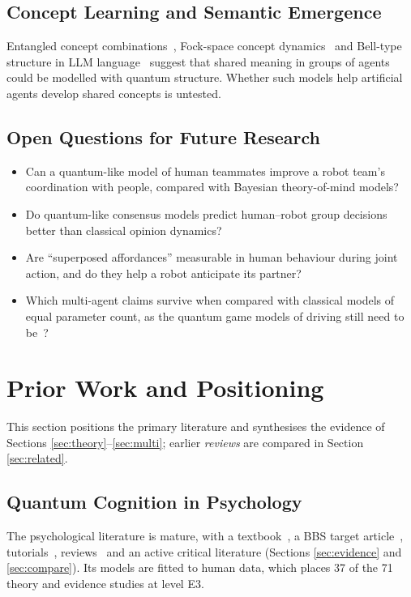 \documentclass[pdflatex,sn-basic]{sn-jnl}
\begin{document}
\subsection{Concept Learning and Semantic Emergence}\label{sec:concepts}
Entangled concept combinations~\citep{Aerts2011a}, Fock-space concept dynamics~\citep{Aerts2013} and Bell-type structure in LLM language~\citep{Aerts2026} suggest that shared meaning in groups of agents could be modelled with quantum structure. Whether such models help artificial agents develop shared concepts is untested.

\subsection{Open Questions for Future Research}\label{sec:multi-open}
\begin{itemize}
\item Can a quantum-like model of human teammates improve a robot team's coordination with people, compared with Bayesian theory-of-mind models?
\item Do quantum-like consensus models predict human--robot group decisions better than classical opinion dynamics?
\item Are ``superposed affordances'' measurable in human behaviour during joint action, and do they help a robot anticipate its partner?
\item Which multi-agent claims survive when compared with classical models of equal parameter count, as the quantum game models of driving still need to be~\citep{Essalmi2025,Essalmi2026}?
\end{itemize}


\section{Prior Work and Positioning}\label{sec:synthesis}
This section positions the primary literature and synthesises the evidence of Sections \ref{sec:theory}--\ref{sec:multi}; earlier \emph{reviews} are compared in Section \ref{sec:related}.

\subsection{Quantum Cognition in Psychology}
The psychological literature is mature, with a textbook~\citep{Busemeyer2012}, a BBS target article~\citep{Pothos2013a}, tutorials~\citep{Yearsley2016a,Yearsley2017}, reviews~\citep{Bruza2015,Pothos2022,Huang2025b} and an active critical literature (Sections \ref{sec:evidence} and \ref{sec:compare}). Its models are fitted to human data, which places 37 of the 71 theory and evidence studies at level E3.
\end{document}
